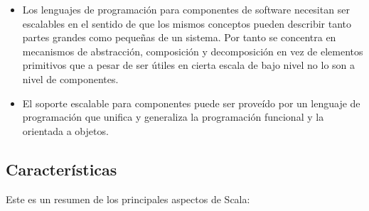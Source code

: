   \begin{itemize}
   \item Los lenguajes de programaci\'on para componentes de software
     necesitan ser escalables en el sentido de que los mismos
     conceptos pueden describir tanto partes grandes como peque\~nas
     de un sistema. Por tanto se concentra en mecanismos de
     abstracci\'on, composici\'on y decomposici\'on en vez de
     elementos primitivos que a pesar de ser \'utiles en cierta escala
     de bajo nivel no lo son a nivel de componentes.

   \item El soporte escalable para componentes puede ser prove\'ido
     por un lenguaje de programaci\'on que unifica y generaliza la
     programaci\'on funcional y la orientada a objetos.

  \end{itemize}
\subsection{Caracter\'isticas}

  Este es un resumen de los principales aspectos de
  Scala\citep{scalaIntro}:
  
